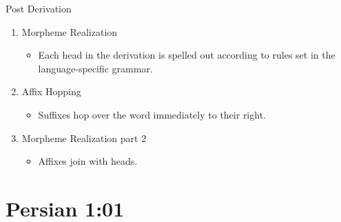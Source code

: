 \documentclass[10pt]{beamer}
\begin{document}
\begin{frame}[fragile]{Post Derivation}
  \pause
  \begin{enumerate}[<+->]
    \item Morpheme Realization
    \begin{itemize}[<+->]
      \item Each head in the derivation is spelled out according to rules set in the language-specific grammar.
    \end{itemize}
    \item Affix Hopping
    \begin{itemize}[<+->]
      \item Suffixes hop over the word immediately to their right.
    \end{itemize}
    \item Morpheme Realization part 2
    \begin{itemize}[<+->]
      \item Affixes join with heads.
    \end{itemize}
  \end{enumerate}

\end{frame}







\section{Persian 1:01}
\end{document}
